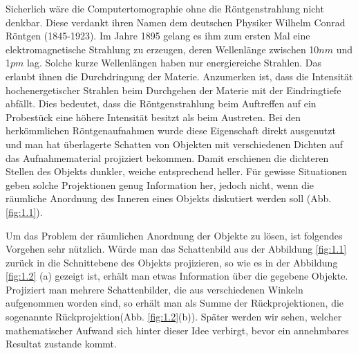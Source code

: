 Sicherlich wäre die Computertomographie ohne die Röntgenstrahlung nicht denkbar. Diese verdankt ihren Namen dem deutschen Physiker Wilhelm Conrad Röntgen (1845-1923). Im Jahre 1895 gelang es ihm zum ersten Mal eine elektromagnetische Strahlung zu erzeugen, deren Wellenlänge zwischen 10$nm$ und 1$pm$ lag. Solche kurze Wellenlängen haben nur energiereiche Strahlen. Das erlaubt ihnen die Durchdringung der Materie. Anzumerken ist, dass die Intensität hochenergetischer Strahlen beim Durchgehen der Materie mit der Eindringtiefe abfällt. Dies bedeutet, dass die Röntgenstrahlung beim Auftreffen auf ein Probestück eine höhere Intensität besitzt als beim Austreten. Bei den herkömmlichen Röntgenaufnahmen wurde diese Eigenschaft direkt ausgenutzt und man hat überlagerte Schatten von Objekten mit verschiedenen Dichten auf das Aufnahmematerial projiziert bekommen. Damit erschienen die dichteren Stellen des Objekts dunkler, weiche entsprechend heller. Für gewisse Situationen geben solche Projektionen genug Information her, jedoch nicht, wenn die räumliche Anordnung des Inneren eines Objekts diskutiert werden soll (Abb.\ref{fig:1.1}).

Um das Problem der räumlichen Anordnung der Objekte zu lösen, ist folgendes Vorgehen sehr nützlich. Würde man das Schattenbild aus der Abbildung \ref{fig:1.1} zurück in die Schnittebene des Objekts projizieren, so wie es in der Abbildung \ref{fig:1.2} (a) gezeigt ist, erhält man etwas Information über die gegebene Objekte. Projiziert man mehrere Schattenbilder, die aus verschiedenen Winkeln aufgenommen worden sind, so erhält man als Summe der Rückprojektionen, die sogenannte Rückprojektion(Abb. \ref{fig:1.2}(b)). Später werden wir sehen, welcher mathematischer Aufwand sich hinter dieser Idee verbirgt, bevor ein annehmbares Resultat zustande kommt.

